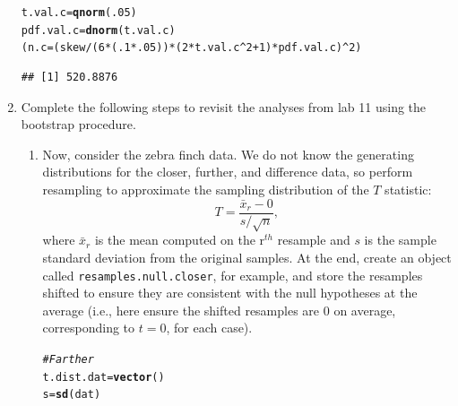 \documentclass{article}\usepackage[]{graphicx}\usepackage[]{xcolor}
\makeatletter
\newcommand{\hlnum}[1]{\textcolor[rgb]{0.686,0.059,0.569}{#1}}%
\newcommand{\hlcom}[1]{\textcolor[rgb]{0.678,0.584,0.686}{\textit{#1}}}%
\newcommand{\hlopt}[1]{\textcolor[rgb]{0,0,0}{#1}}%
\newcommand{\hldef}[1]{\textcolor[rgb]{0.345,0.345,0.345}{#1}}%
\newcommand{\hlkwb}[1]{\textcolor[rgb]{0.69,0.353,0.396}{#1}}%
\newcommand{\hlkwd}[1]{\textcolor[rgb]{0.737,0.353,0.396}{\textbf{#1}}}%
\newenvironment{kframe}{%
 \def\at@end@of@kframe{}%
 \ifinner\ifhmode%
  \def\at@end@of@kframe{\end{minipage}}%
  \begin{minipage}{\columnwidth}%
 \fi\fi%
 \def\FrameCommand##1{\hskip\@totalleftmargin \hskip-\fboxsep
 \colorbox{shadecolor}{##1}\hskip-\fboxsep
     \hskip-\linewidth \hskip-\@totalleftmargin \hskip\columnwidth}%
 \MakeFramed {\advance\hsize-\width
   \@totalleftmargin\z@ \linewidth\hsize
   \@setminipage}}%
 {\par\unskip\endMakeFramed%
 \at@end@of@kframe}
\newenvironment{knitrout}{}{} %
\makeatother
\begin{document}
\begin{enumerate}
\begin{enumerate}
\end{enumerate}
\begin{knitrout}\scriptsize
{}\color{fgcolor}\begin{kframe}
\begin{alltt}
\hldef{t.val.c} \hlkwb{=} \hlkwd{qnorm}\hldef{(}\hlnum{.05}\hldef{)}
\hldef{pdf.val.c} \hlkwb{=} \hlkwd{dnorm}\hldef{(t.val.c)}
\hldef{(n.c} \hlkwb{=} \hldef{(skew}\hlopt{/}\hldef{(}\hlnum{6}\hlopt{*}\hldef{(}\hlnum{.1}\hlopt{*}\hlnum{.05}\hldef{))}\hlopt{*}\hldef{(}\hlnum{2}\hlopt{*}\hldef{t.val.c}\hlopt{^}\hlnum{2}\hlopt{+}\hlnum{1}\hldef{)}\hlopt{*}\hldef{pdf.val.c)}\hlopt{^}\hlnum{2}\hldef{)}
\end{alltt}
\begin{verbatim}
## [1] 520.8876
\end{verbatim}
\end{kframe}
\end{knitrout}
\item Complete the following steps to revisit the analyses from lab 11 using the
bootstrap procedure.
\begin{enumerate}
\item Now, consider the zebra finch data. We do not know the generating distributions
for the closer, further, and difference data, so perform resampling to approximate the 
sampling distribution of the $T$ statistic:
  \[T = \frac{\bar{x}_r - 0}{s/\sqrt{n}},\]
  where $\bar{x}_r$ is the mean computed on the r$^{th}$ resample and $s$ is the
  sample standard deviation from the original samples. At the end, create an
  object called \texttt{resamples.null.closer}, for example, and store the 
  resamples shifted to ensure they are consistent with the null hypotheses at the average 
  (i.e., here ensure the shifted resamples are 0 on average, corresponding
  to $t=0$, for each case). 
\begin{knitrout}\scriptsize
{}\color{fgcolor}\begin{kframe}
\begin{alltt}
\hlcom{#Farther}
\hldef{t.dist.dat} \hlkwb{=} \hlkwd{vector}\hldef{()}
\hldef{s} \hlkwb{=} \hlkwd{sd}\hldef{(dat)}

\end{alltt}
\end{kframe}
\end{knitrout}
\end{enumerate}
\end{enumerate}
\end{document}
